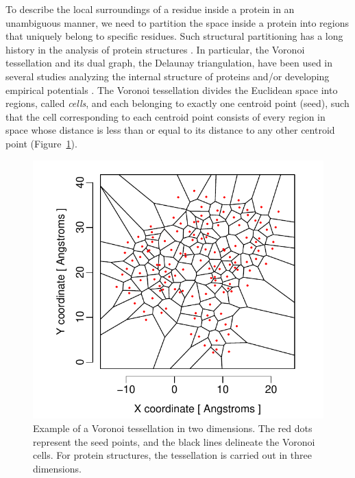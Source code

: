 \documentclass[12pt]{article}
\begin{document}
To describe the local surroundings of a residue inside a protein in an unambiguous manner, we need to partition the space inside a protein into regions that uniquely belong to specific residues. Such structural partitioning has a long history in the analysis of protein structures \cite{richards_interpretation_1974, gerstein_volume_1994}. In particular, the Voronoi tessellation and its dual graph, the Delaunay triangulation, have been used in several studies analyzing the internal structure of proteins and/or developing empirical potentials \cite{zomorodian_geometric_2006, zhou_alpha_2014, xia_identifying_2014}.
The Voronoi tessellation divides the Euclidean space into regions, called {\it cells}, and each belonging to exactly one centroid point (seed), such that the cell corresponding to each centroid point consists of every region in space whose distance is less than or equal to its distance to any other centroid point (Figure~\ref{fig:voronoi}).

    \begin{figure}
        \begin{center}
            \includegraphics[width=6in]{voronoi_diagram.pdf}
        \end{center}
        \caption{Example of a Voronoi tessellation in two dimensions. The red dots represent the seed points, and the black lines delineate the Voronoi cells. For protein structures, the tessellation is carried out in three dimensions.}
        \label{fig:voronoi}
    \end{figure}
\end{document}
